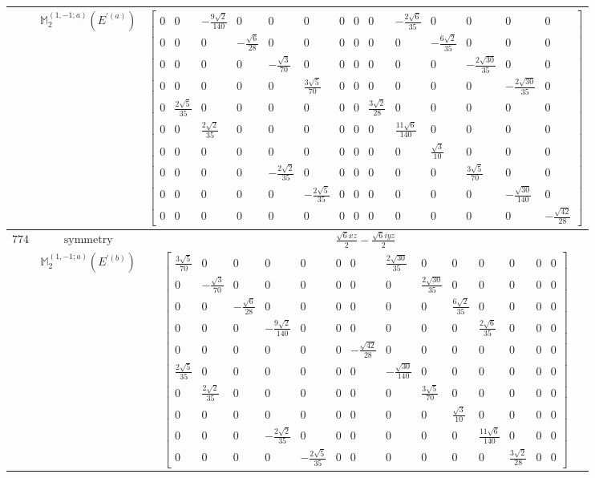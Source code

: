 \documentclass[fleqn,8pt,landscape]{jsarticle}
\begin{document}
\begin{longtable}{ccc}
$  $ & $ \mathbb{M}_{2}^{(1,-1;a)}(E^{\prime(a)}) $ & $ \begin{bmatrix} 0 & 0 & - \frac{9 \sqrt{2}}{140} & 0 & 0 & 0 & 0 & 0 & 0 & - \frac{2 \sqrt{6}}{35} & 0 & 0 & 0 & 0 \\ 0 & 0 & 0 & - \frac{\sqrt{6}}{28} & 0 & 0 & 0 & 0 & 0 & 0 & - \frac{6 \sqrt{2}}{35} & 0 & 0 & 0 \\ 0 & 0 & 0 & 0 & - \frac{\sqrt{3}}{70} & 0 & 0 & 0 & 0 & 0 & 0 & - \frac{2 \sqrt{30}}{35} & 0 & 0 \\ 0 & 0 & 0 & 0 & 0 & \frac{3 \sqrt{5}}{70} & 0 & 0 & 0 & 0 & 0 & 0 & - \frac{2 \sqrt{30}}{35} & 0 \\ 0 & \frac{2 \sqrt{5}}{35} & 0 & 0 & 0 & 0 & 0 & 0 & \frac{3 \sqrt{2}}{28} & 0 & 0 & 0 & 0 & 0 \\ 0 & 0 & \frac{2 \sqrt{2}}{35} & 0 & 0 & 0 & 0 & 0 & 0 & \frac{11 \sqrt{6}}{140} & 0 & 0 & 0 & 0 \\ 0 & 0 & 0 & 0 & 0 & 0 & 0 & 0 & 0 & 0 & \frac{\sqrt{3}}{10} & 0 & 0 & 0 \\ 0 & 0 & 0 & 0 & - \frac{2 \sqrt{2}}{35} & 0 & 0 & 0 & 0 & 0 & 0 & \frac{3 \sqrt{5}}{70} & 0 & 0 \\ 0 & 0 & 0 & 0 & 0 & - \frac{2 \sqrt{5}}{35} & 0 & 0 & 0 & 0 & 0 & 0 & - \frac{\sqrt{30}}{140} & 0 \\ 0 & 0 & 0 & 0 & 0 & 0 & 0 & 0 & 0 & 0 & 0 & 0 & 0 & - \frac{\sqrt{42}}{28} \end{bmatrix} $ \\ \hline
$ 774 $ & $ \text{symmetry} $ & $ \frac{\sqrt{6} x z}{2} - \frac{\sqrt{6} i y z}{2} $ \\
$  $ & $ \mathbb{M}_{2}^{(1,-1;a)}(E^{\prime(b)}) $ & $ \begin{bmatrix} \frac{3 \sqrt{5}}{70} & 0 & 0 & 0 & 0 & 0 & 0 & \frac{2 \sqrt{30}}{35} & 0 & 0 & 0 & 0 & 0 & 0 \\ 0 & - \frac{\sqrt{3}}{70} & 0 & 0 & 0 & 0 & 0 & 0 & \frac{2 \sqrt{30}}{35} & 0 & 0 & 0 & 0 & 0 \\ 0 & 0 & - \frac{\sqrt{6}}{28} & 0 & 0 & 0 & 0 & 0 & 0 & \frac{6 \sqrt{2}}{35} & 0 & 0 & 0 & 0 \\ 0 & 0 & 0 & - \frac{9 \sqrt{2}}{140} & 0 & 0 & 0 & 0 & 0 & 0 & \frac{2 \sqrt{6}}{35} & 0 & 0 & 0 \\ 0 & 0 & 0 & 0 & 0 & 0 & - \frac{\sqrt{42}}{28} & 0 & 0 & 0 & 0 & 0 & 0 & 0 \\ \frac{2 \sqrt{5}}{35} & 0 & 0 & 0 & 0 & 0 & 0 & - \frac{\sqrt{30}}{140} & 0 & 0 & 0 & 0 & 0 & 0 \\ 0 & \frac{2 \sqrt{2}}{35} & 0 & 0 & 0 & 0 & 0 & 0 & \frac{3 \sqrt{5}}{70} & 0 & 0 & 0 & 0 & 0 \\ 0 & 0 & 0 & 0 & 0 & 0 & 0 & 0 & 0 & \frac{\sqrt{3}}{10} & 0 & 0 & 0 & 0 \\ 0 & 0 & 0 & - \frac{2 \sqrt{2}}{35} & 0 & 0 & 0 & 0 & 0 & 0 & \frac{11 \sqrt{6}}{140} & 0 & 0 & 0 \\ 0 & 0 & 0 & 0 & - \frac{2 \sqrt{5}}{35} & 0 & 0 & 0 & 0 & 0 & 0 & \frac{3 \sqrt{2}}{28} & 0 & 0 \end{bmatrix} $ \\ \hline

\end{longtable}
\end{document}
